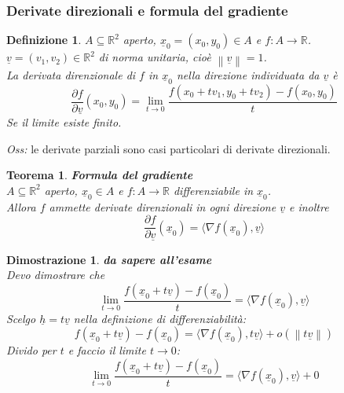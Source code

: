 \documentclass{scrreprt}
\newtheorem{defn}{Definizione}
\newenvironment{definition}{\begin{mdframed}[backgroundcolor=Ivory2]\begin{defn}}{\end{defn}\end{mdframed}}
\newtheorem{teorema}{Teorema}
\newenvironment{thm}{\begin{mdframed}[backgroundcolor=Ivory2]\begin{teorema}}{\end{teorema}\end{mdframed}}
\newtheorem{demnstrn}{Dimostrazione}
\newenvironment{dimostrazione}{\begin{mdframed}[backgroundcolor=LightCyan1]\begin{demnstrn}}{\end{demnstrn}\end{mdframed}}
\begin{document}
\subsubsection{Derivate direzionali e formula del gradiente}
\begin{definition}
	$A \subseteq \mathbb{R}^2$ aperto, $\underline{x}_0 = (x_0, y_0) \in A$ e $f: A \to \mathbb{R}$.\\
	$\underline{v} = (v_1, v_2)\in \mathbb{R}^2$ di norma unitaria, cioè $\left\lVert \underline{v} \right\rVert = 1$.\\
	La derivata direnzionale di $f$ in $\underline{x}_0$ nella direzione individuata da $\underline{v}$ è
	\begin{equation}
		\frac{\partial f}{\partial \underline{v}} (x_0, y_0) = \lim_{t \to 0} \frac{f(x_0 + t v_1, y_0 + t v_2) - f(x_0, y_0)}{t}
	\end{equation}
	Se il limite esiste finito.
\end{definition}
\emph{Oss:} le derivate parziali sono casi particolari di derivate direzionali.\\

\begin{thm} \textbf{Formula del gradiente}\\
	$A \subseteq \mathbb{R}^2$ aperto, $\underline{x}_0 \in A$ e $f: A \to \mathbb{R}$ differenziabile in $\underline{x}_0$.\\
	Allora $f$ ammette derivate direnzionali in ogni direzione $\underline{v}$ e inoltre
	\begin{equation}
		\frac{\partial f}{\partial \underline{v}} (\underline{x}_0) = \langle \nabla f(\underline{x}_0), \underline{v} \rangle
	\end{equation}
\end{thm}
\begin{dimostrazione}
	\emph{\textbf{da sapere all'esame}}\\
	Devo dimostrare che 
	\begin{equation}
		\lim_{t \to 0} \frac{f(\underline{x}_0 +t\underline{v})-f(\underline{x}_0)}{t} = \langle \nabla f(\underline{x}_0), \underline{v} \rangle
	\end{equation}
	Scelgo $\underline{h} = t \underline{v}$ nella definizione di differenziabilità:
	\begin{equation}
		f(\underline{x}_0 +t\underline{v})-f(\underline{x}_0) = \langle \nabla f(\underline{x}_0), t \underline{v} \rangle + o(\left\lVert t\underline{v}\right\rVert )
	\end{equation}
	Divido per $t$ e faccio il limite $t \to 0$:
	\begin{equation}
		\lim_{t \to 0} \frac{f(\underline{x}_0 +t\underline{v})-f(\underline{x}_0)}{t} = \langle \nabla f(\underline{x}_0), \underline{v} \rangle + 0
	\end{equation}
\end{dimostrazione}
\end{document}
